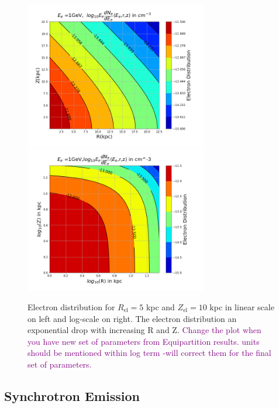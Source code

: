\documentclass[12pt, a4 paper]{article}
\newcommand{\Andrew}[1]{\textcolor{dg}{#1}}
\newcommand{\Vasu}[1]{{\color{purple}#1}}
\begin{document}
\begin{figure}[h!]
    \centering
    \includegraphics[width= 8cm]{Images/EdNdE_1GeV.png}%
    \includegraphics[width = 8cm]{Images/Logscale_EdNdE_1GeV.png}
    \caption{Electron distribution for $R_{\mathrm{el}} = 5$ kpc and $Z_{\mathrm{el}} = 10$ kpc in linear scale on left and log-scale on right. The electron distribution an exponential drop with increasing R and Z. \textcolor{purple}{Change the plot when you have new set of parameters from Equipartition results. \Andrew{units should be mentioned within log term} \Vasu{-will correct them for the final set of parameters.}}}
    \label{fig:my_label}
\end{figure}

\subsection{Synchrotron Emission}\label{Synchrotron_theory}
\end{document}
